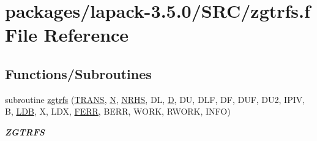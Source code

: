 \hypertarget{zgtrfs_8f}{}\section{packages/lapack-\/3.5.0/\+S\+R\+C/zgtrfs.f File Reference}
\label{zgtrfs_8f}
\subsection*{Functions/\+Subroutines}
\begin{DoxyCompactItemize}
\item 
subroutine \hyperlink{group__complex16GTcomputational_gaef94b3e5def942900d60d274131ddf7e}{zgtrfs} (\hyperlink{superlu__enum__consts_8h_a0c4e17b2d5cea33f9991ccc6a6678d62a1f61e3015bfe0f0c2c3fda4c5a0cdf58}{T\+R\+A\+N\+S}, \hyperlink{polmisc_8c_a0240ac851181b84ac374872dc5434ee4}{N}, \hyperlink{example__user_8c_aa0138da002ce2a90360df2f521eb3198}{N\+R\+H\+S}, D\+L, \hyperlink{odrpack_8h_a7dae6ea403d00f3687f24a874e67d139}{D}, D\+U, D\+L\+F, D\+F, D\+U\+F, D\+U2, I\+P\+I\+V, B, \hyperlink{example__user_8c_a50e90a7104df172b5a89a06c47fcca04}{L\+D\+B}, X, L\+D\+X, \hyperlink{superlu__enum__consts_8h_af00a42ecad444bbda75cde1b64bd7e72a78fd14d7abebae04095cfbe02928f153}{F\+E\+R\+R}, B\+E\+R\+R, W\+O\+R\+K, R\+W\+O\+R\+K, I\+N\+F\+O)
\begin{DoxyCompactList}\small\item\em {\bfseries Z\+G\+T\+R\+F\+S} \end{DoxyCompactList}\end{DoxyCompactItemize}
